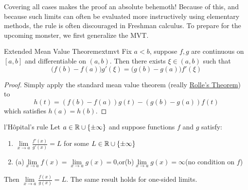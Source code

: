 Covering all cases makes the proof an absolute behemoth! Because of this, and because such limits can often be evaluated more instructively using elementary methods, the rule is often discouraged in Freshman calculus. To prepare for the upcoming monster, we first  generalize the MVT.

\begin{lemm}{Extended Mean Value Theorem}{extmvt}
Fix $a<b$, suppose $f,g$ are continuous on $[a,b]$ and differentiable on $(a,b)$. Then there exists $\xi\in(a,b)$ such that
\[\big(f(b)-f(a)\big)g'(\xi)=\big(g(b)-g(a)\big)f'(\xi)\] 
\end{lemm}

\begin{proof}
Simply apply the standard mean value theorem (really \hyperref[lemm:rolle]{Rolle's Theorem}) to
\[h(t)=(f(b)-f(a))g(t)-(g(b)-g(a))f(t)\]
which satisfies $h(a)=h(b)$.
\end{proof}\goodbreak

\begin{thm}{l'Hôpital's rule}{}
Let $a\in\mathbb{R}\cup\{\pm\infty\}$ and suppose functions $f$ and $g$ satisfy:
\begin{enumerate}%
  \item $\displaystyle\lim\limits_{x\to a}\frac{f'(x)}{g'(x)}=L$ for some $L\in\mathbb{R}\cup\{\pm\infty\}$
  \item (a)\space\space $\displaystyle\lim\limits_{x\to a}f(x)=\lim\limits_{x\to a} g(x)=0$,\quad or\quad (b)\space\space $\displaystyle\lim\limits_{x\to a}g(x)=\infty$\space\space (no condition on $f$)
\end{enumerate}
Then $\displaystyle\lim\limits_{x\to a}\frac{f(x)}{g(x)}=L$. The same result holds for one-sided limits.
\end{thm}

\vfil

